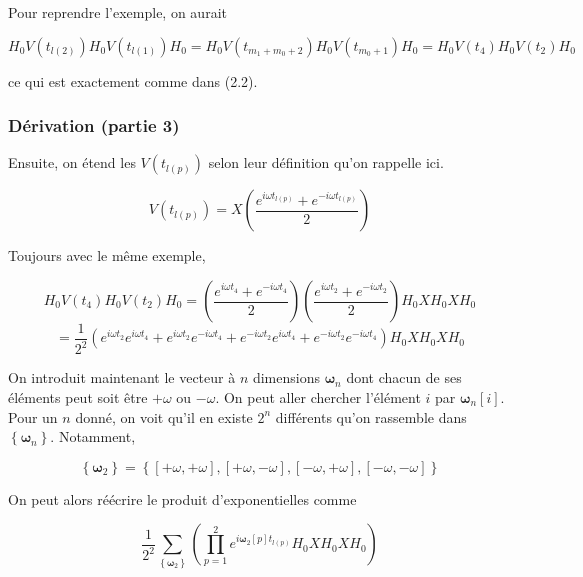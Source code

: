 Pour reprendre l'exemple, on aurait 

\begin{equation*}
    H_0V(t_{l(2)})H_0V(t_{l(1)})H_0 = H_0V(t_{m_1 + m_0 + 2})H_0V(t_{m_0 + 1})H_0 = H_0V(t_4)H_0V(t_2)H_0
\end{equation*}

ce qui est exactement comme dans (2.2).

\subsubsection{Dérivation (partie 3)}
Ensuite, on étend les $V(t_{l(p)})$ selon leur définition qu'on rappelle ici.

\begin{equation*}
    V(t_{l(p)}) = X\left(\frac{e^{i\omega t_{l(p)}} + e^{-i\omega t_{l(p)}}}{2}\right)
\end{equation*}

Toujours avec le même exemple,

\begin{equation*}
    H_0V(t_4)H_0V(t_2)H_0 = \left(\frac{e^{i\omega t_4} + e^{-i\omega t_4}}{2}\right)\left(\frac{e^{i\omega t_2} + e^{-i\omega t_2}}{2}\right)H_0XH_0XH_0 
\end{equation*}
\begin{equation*}
    = \frac{1}{2^2}\left(e^{i\omega t_2}e^{i\omega t_4} + e^{i\omega t_2}e^{-i\omega t_4} + e^{-i\omega t_2}e^{i\omega t_4} + e^{-i\omega t_2}e^{-i\omega t_4}\right)H_0XH_0XH_0
\end{equation*}

On introduit maintenant le vecteur à $n$ dimensions $\boldsymbol{\omega}_n$ dont chacun de ses éléments peut soit être $+\omega$ ou $-\omega$. On peut aller chercher l'élément $i$ par $\boldsymbol{\omega}_n[i]$. Pour un $n$ donné, on voit qu'il en existe $2^n$ différents qu'on rassemble dans $\left\{\boldsymbol{\omega}_n\right\}$. Notamment, 

\begin{equation*}
    \left\{\boldsymbol{\omega}_2\right\} = \left\{\left[+\omega, +\omega\right], \left[+\omega, -\omega\right], \left[-\omega, +\omega\right], \left[-\omega, -\omega\right]\right\}    
\end{equation*}

On peut alors réécrire le produit d'exponentielles comme

\begin{equation*}
    \frac{1}{2^2}\sum_{\left\{\boldsymbol{\omega}_2\right\}}\left(\prod_{p=1}^{2}e^{i\boldsymbol{\omega}_2[p]t_{l(p)}} H_0XH_0XH_0\right)
\end{equation*}

